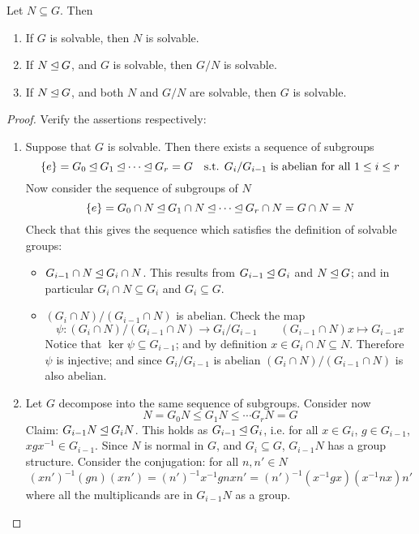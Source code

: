 \documentclass{article}
\begin{document}
\begin{proposition}\label{prop: relations of solvability}
    Let $N \subseteq G$. Then
    \begin{enumerate}[label=\roman*)]
        \item If $G$ is solvable, then $N$ is solvable.
        \item If $N \unlhd G$, and $G$ is solvable, then $G/N$ is solvable.
        \item If $N \unlhd G$, and both $N$ and $G/N$ are solvable, then $G$ is solvable.
    \end{enumerate}
\end{proposition}

\begin{proof}
    Verify the assertions respectively:
    \begin{enumerate}[label=\roman*)]
        \item Suppose that $G$ is solvable. Then there exists a sequence of subgroups
        \[
            \{e\} = G_0 \unlhd G_1 \unlhd \cdots \unlhd G_r = G \quad \text{s.t. $G_i/G_{i-1}$ is abelian for all $1 \leq i \leq r$}
        \]
        Now consider the sequence of subgroups of $N$
        \[
            \{e\} = G_0 \cap N \unlhd G_1 \cap N \unlhd \cdots \unlhd G_r \cap N = G \cap N = N
        \]
        Check that this gives the sequence which satisfies the definition of solvable groups:
        \begin{itemize}
            \item $G_{i-1} \cap N \unlhd G_i \cap N$. This results from $G_{i-1} \unlhd G_i$ and $N \unlhd G$; and in particular $G_i \cap N \subseteq G_i$ and $G_i \subseteq G$.
            \item $(G_i \cap N)/(G_{i-1} \cap N)$ is abelian. Check the map
            \[
                \psi: (G_i \cap N)/(G_{i-1} \cap N) \to G_i/G_{i-1} \qquad (G_{i-1} \cap N) x \mapsto G_{i-1} x
            \]
            Notice that $\ker \psi \subseteq G_{i-1}$; and by definition $x \in G_i \cap N \subseteq N$. Therefore $\psi$ is injective; and since $G_i/G_{i-1}$ is abelian $(G_i \cap N)/(G_{i-1} \cap N)$ is also abelian.
        \end{itemize}
        \item Let $G$ decompose into the same sequence of subgroups. Consider now
        \[
            N = G_0 N \leq G_1 N \leq \cdots G_r N = G
        \]
        Claim: $G_{i-1} N \unlhd G_i N$. This holds as $G_{i-1} \unlhd G_i$, i.e. for all $x \in G_i$, $g \in G_{i-1}$, $xgx^{-1} \in G_{i-1}$. Since $N$ is normal in $G$, and $G_i \subseteq G$, $G_{i-1}N$ has a group structure. Consider the conjugation: for all $n, n' \in N$
        \[
            (x n')^{-1} (gn) (xn') = (n')^{-1} x^{-1} g n x n' = (n')^{-1} (x^{-1} g x) (x^{-1} n x) n'
        \]
        where all the multiplicands are in $G_{i-1}N$ as a group. 


\end{enumerate}
\end{proof}
\end{document}
